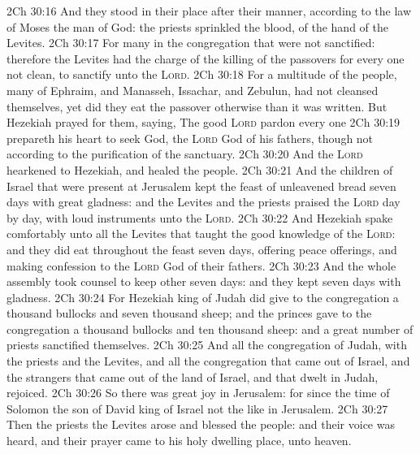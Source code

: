 \vs 2Ch 30:16 And they stood in their place after their manner, according to the law of Moses the man of God: the priests sprinkled the blood,  of the hand of the Levites.
\vs 2Ch 30:17 For  many in the congregation that were not sanctified: therefore the Levites had the charge of the killing of the passovers for every one  not clean, to sanctify  unto the \textsc{Lord}.
\vs 2Ch 30:18 For a multitude of the people,  many of Ephraim, and Manasseh, Issachar, and Zebulun, had not cleansed themselves, yet did they eat the passover otherwise than it was written. But Hezekiah prayed for them, saying, The good \textsc{Lord} pardon every one
\vs 2Ch 30:19  prepareth his heart to seek God, the \textsc{Lord} God of his fathers, though  not  according to the purification of the sanctuary.
\vs 2Ch 30:20 And the \textsc{Lord} hearkened to Hezekiah, and healed the people.
\vs 2Ch 30:21 And the children of Israel that were present at Jerusalem kept the feast of unleavened bread seven days with great gladness: and the Levites and the priests praised the \textsc{Lord} day by day,  with loud instruments unto the \textsc{Lord}.
\vs 2Ch 30:22 And Hezekiah spake comfortably unto all the Levites that taught the good knowledge of the \textsc{Lord}: and they did eat throughout the feast seven days, offering peace offerings, and making confession to the \textsc{Lord} God of their fathers.
\vs 2Ch 30:23 And the whole assembly took counsel to keep other seven days: and they kept  seven days with gladness.
\vs 2Ch 30:24 For Hezekiah king of Judah did give to the congregation a thousand bullocks and seven thousand sheep; and the princes gave to the congregation a thousand bullocks and ten thousand sheep: and a great number of priests sanctified themselves.
\vs 2Ch 30:25 And all the congregation of Judah, with the priests and the Levites, and all the congregation that came out of Israel, and the strangers that came out of the land of Israel, and that dwelt in Judah, rejoiced.
\vs 2Ch 30:26 So there was great joy in Jerusalem: for since the time of Solomon the son of David king of Israel  not the like in Jerusalem.
\vs 2Ch 30:27 Then the priests the Levites arose and blessed the people: and their voice was heard, and their prayer came  to his holy dwelling place,  unto heaven.
